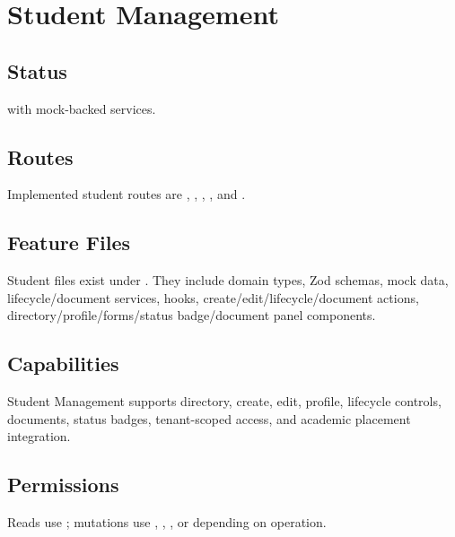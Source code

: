 \chapter{Student Management}
\section{Status}
\implemented{} with mock-backed services.

\section{Routes}
Implemented student routes are , , , , and .

\section{Feature Files}
Student files exist under . They include domain types, Zod schemas, mock data, lifecycle/document services, hooks, create/edit/lifecycle/document actions, directory/profile/forms/status badge/document panel components.

\section{Capabilities}
Student Management supports directory, create, edit, profile, lifecycle controls, documents, status badges, tenant-scoped access, and academic placement integration.

\section{Permissions}
Reads use ; mutations use , , , or  depending on operation.
